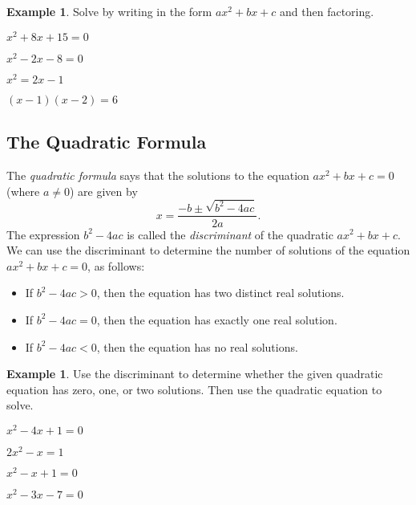 \documentclass[letterpaper,12pt,oneside]{book}
\theoremstyle{definition}
\newtheorem{example}[theorem]{Example}
\begin{document}
\begin{example}
Solve by writing in the form $ax^2+bx+c$ and then factoring.
\begin{enumerate}
\begin{multicols*}{2}
\item $x^2+8x+15=0$
\vfill\null
\item $x^2-2x-8=0$
\vfill\null
\columnbreak
\item $x^2=2x-1$
\vfill\null
\item $(x-1)(x-2)=6$
\vfill\null
\end{multicols*}
\end{enumerate}
\end{example}

\newpage

\subsection*{The Quadratic Formula}

The \emph{quadratic formula} says that the solutions to the equation $ax^2+bx+c=0$ (where $a\neq 0$) are given by
\[
x=\frac{-b\pm \sqrt{b^2-4ac}}{2a}.
\]
The expression $b^2-4ac$ is called the \emph{discriminant} of the quadratic $ax^2+bx+c$.  We can use the discriminant to determine the number of solutions of the equation $ax^2+bx+c=0$, as follows:
\begin{itemize}
\item If $b^2-4ac>0$, then the equation has two distinct real solutions.
\item If $b^2-4ac=0$, then the equation has exactly one real solution.
\item If $b^2-4ac<0$, then the equation has no real solutions.
\end{itemize}

\begin{example}
Use the discriminant to determine whether the given quadratic equation has zero, one, or two solutions.  Then use the quadratic equation to solve.
\begin{enumerate}
\begin{multicols*}{2}
\item $x^2-4x+1=0$
\vfill\null
\item $2x^2-x=1$
\vfill\null
\columnbreak
\item $x^2-x+1=0$
\vfill\null
\item $x^2-3x-7=0$
\vfill\null
\end{multicols*}
\end{enumerate}
\end{example}
\end{document}
